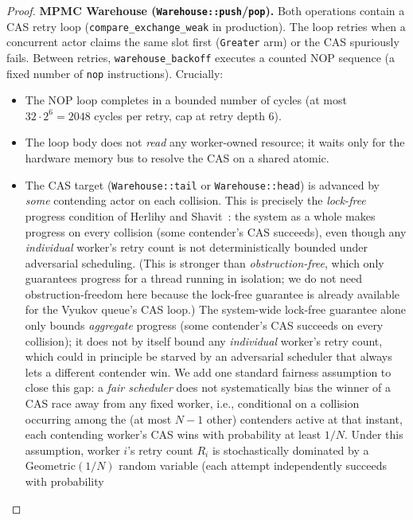\documentclass[11pt,a4paper]{article}
\newcommand{\code}[1]{\texttt{#1}}
\begin{document}
\begin{proof}
\medskip
\textbf{MPMC Warehouse (\code{Warehouse::push}/\code{pop}).}
Both operations contain a CAS retry loop (\code{compare\_exchange\_weak}
in production).  The loop retries when a concurrent actor claims the
same slot first (\code{Greater} arm) or the CAS spuriously fails.
Between retries, \code{warehouse\_backoff} executes a counted NOP
sequence (a fixed number of \code{nop} instructions).  Crucially:
\begin{itemize}
  \item The NOP loop completes in a bounded number of cycles
        (at most $32 \cdot 2^6 = 2048$ cycles per retry, cap at retry
        depth 6).
  \item The loop body does not \emph{read} any worker-owned resource;
        it waits only for the hardware memory bus to resolve the CAS
        on a shared atomic.
  \item The CAS target (\code{Warehouse::tail} or \code{Warehouse::head})
        is advanced by \emph{some} contending actor on each collision.
        This is precisely the \emph{lock-free} progress condition of
        Herlihy and Shavit~\cite{herlihy_shavit2008}: the system as a
        whole makes progress on every collision (some contender's CAS
        succeeds), even though any \emph{individual} worker's retry
        count is not deterministically bounded under adversarial
        scheduling. (This is stronger than \emph{obstruction-free}, which
        only guarantees progress for a thread running in isolation; we
        do not need obstruction-freedom here because the lock-free
        guarantee is already available for the Vyukov queue's CAS loop.)
        The system-wide lock-free guarantee alone only bounds
        \emph{aggregate} progress (some contender's CAS succeeds on
        every collision); it does not by itself bound any
        \emph{individual} worker's retry count, which could in
        principle be starved by an adversarial scheduler that always
        lets a different contender win. We add one standard fairness
        assumption to close this gap: a \emph{fair scheduler} does not
        systematically bias the winner of a CAS race away from any
        fixed worker, i.e., conditional on a collision occurring among
        the (at most $N-1$ other) contenders active at that instant,
        each contending worker's CAS wins with probability at least
        $1/N$. Under this assumption, worker $i$'s retry count $R_i$ is
        stochastically dominated by a $\mathrm{Geometric}(1/N)$ random
        variable (each attempt independently succeeds with probability

\end{itemize}
\end{proof}
\end{document}
